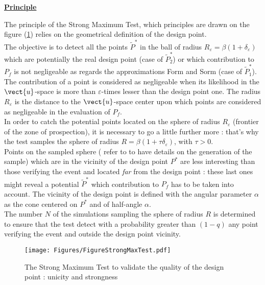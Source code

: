 {  \vspace{2mm}

  \underline{\textbf{Principle}} \vspace{2mm}

  The principle of the Strong Maximum Test, which principles are drawn on the figure (\ref{SMT}) relies on the geometrical definition of the design point. \\
  The objective is to detect all the points $\tilde{P}^*$ in the ball of radius $R_{\varepsilon} = \beta(1+\delta_{\varepsilon})$ which are potentially the real design point (case of $\tilde{P}_2^*$) or which contribution to $P_f$ is not negligeable as regards the approximations Form and Sorm (case of $\tilde{P}_1^*$). The contribution of a point is considered as negligeable when its likelihood in the $\vect{u}$-space is more than $\varepsilon$-times lesser than the design point one. The radius $R_{\varepsilon}$ is the distance to the $\vect{u}$-space center upon which points are considered as negligeable in the evaluation of $P_f$.\\
  In order to catch the potential points located on the sphere of radius $R_{\varepsilon}$ (frontier of the zone of prospection), it is necessary to go a little further more : that's why the test samples the sphere of radius  $R = \beta(1+\tau \delta_{\varepsilon})$, with $\tau >0$.\\
  Points on the sampled sphere ( refer to  to have details on the generation of the sample) which are in the vicinity of the design point $P^*$ are less interesting than those verifying the event and located {\itshape far} from the design point : these last ones might reveal a potential $\tilde{P}^*$ which contribution to $P_f$ has to be taken into account. The  vicinity of the design point is defined with the angular parameter $\alpha$ as the cone centered on $P^*$ and of half-angle $\alpha$.\\
  The number $N$ of the simulations sampling the sphere of radius $R$ is determined  to ensure that the test detect with a probability greater than $(1 - q)$ any point verifying the event and outside the design point vicinity.

  \begin{figure}[H]
    \begin{center}
      \texttt{[image: Figures/FigureStrongMaxTest.pdf]}
      \caption{The Strong Maximum Test to validate the quality of the design point : unicity and strongness}
      \label{SMT}
    \end{center}
  \end{figure}

}
